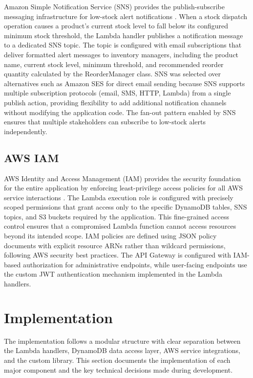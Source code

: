 \documentclass[conference]{IEEEtran}
\begin{document}
Amazon Simple Notification Service (SNS) provides the publish-subscribe messaging infrastructure for low-stock alert notifications \cite{awssns}. When a stock dispatch operation causes a product's current stock level to fall below its configured minimum stock threshold, the Lambda handler publishes a notification message to a dedicated SNS topic. The topic is configured with email subscriptions that deliver formatted alert messages to inventory managers, including the product name, current stock level, minimum threshold, and recommended reorder quantity calculated by the ReorderManager class. SNS was selected over alternatives such as Amazon SES for direct email sending because SNS supports multiple subscription protocols (email, SMS, HTTP, Lambda) from a single publish action, providing flexibility to add additional notification channels without modifying the application code. The fan-out pattern enabled by SNS ensures that multiple stakeholders can subscribe to low-stock alerts independently.

\subsection{AWS IAM}

AWS Identity and Access Management (IAM) provides the security foundation for the entire application by enforcing least-privilege access policies for all AWS service interactions \cite{awsiam}. The Lambda execution role is configured with precisely scoped permissions that grant access only to the specific DynamoDB tables, SNS topics, and S3 buckets required by the application. This fine-grained access control ensures that a compromised Lambda function cannot access resources beyond its intended scope. IAM policies are defined using JSON policy documents with explicit resource ARNs rather than wildcard permissions, following AWS security best practices. The API Gateway is configured with IAM-based authorization for administrative endpoints, while user-facing endpoints use the custom JWT authentication mechanism implemented in the Lambda handlers.

\section{Implementation}

The implementation follows a modular structure with clear separation between the Lambda handlers, DynamoDB data access layer, AWS service integrations, and the custom library. This section documents the implementation of each major component and the key technical decisions made during development.
\end{document}
